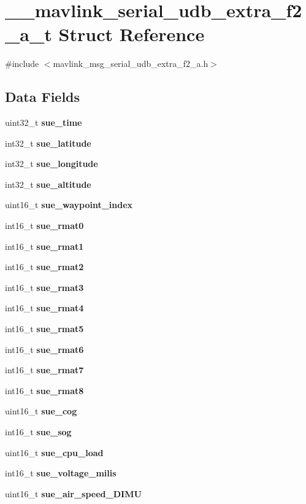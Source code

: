 \section{\+\_\+\+\_\+mavlink\+\_\+serial\+\_\+udb\+\_\+extra\+\_\+f2\+\_\+a\+\_\+t Struct Reference}
\label{struct____mavlink__serial__udb__extra__f2__a__t}


{\ttfamily \#include $<$mavlink\+\_\+msg\+\_\+serial\+\_\+udb\+\_\+extra\+\_\+f2\+\_\+a.\+h$>$}

\subsection*{Data Fields}
\begin{DoxyCompactItemize}
\item 
uint32\+\_\+t \textbf{ sue\+\_\+time}
\item 
int32\+\_\+t \textbf{ sue\+\_\+latitude}
\item 
int32\+\_\+t \textbf{ sue\+\_\+longitude}
\item 
int32\+\_\+t \textbf{ sue\+\_\+altitude}
\item 
uint16\+\_\+t \textbf{ sue\+\_\+waypoint\+\_\+index}
\item 
int16\+\_\+t \textbf{ sue\+\_\+rmat0}
\item 
int16\+\_\+t \textbf{ sue\+\_\+rmat1}
\item 
int16\+\_\+t \textbf{ sue\+\_\+rmat2}
\item 
int16\+\_\+t \textbf{ sue\+\_\+rmat3}
\item 
int16\+\_\+t \textbf{ sue\+\_\+rmat4}
\item 
int16\+\_\+t \textbf{ sue\+\_\+rmat5}
\item 
int16\+\_\+t \textbf{ sue\+\_\+rmat6}
\item 
int16\+\_\+t \textbf{ sue\+\_\+rmat7}
\item 
int16\+\_\+t \textbf{ sue\+\_\+rmat8}
\item 
uint16\+\_\+t \textbf{ sue\+\_\+cog}
\item 
int16\+\_\+t \textbf{ sue\+\_\+sog}
\item 
uint16\+\_\+t \textbf{ sue\+\_\+cpu\+\_\+load}
\item 
int16\+\_\+t \textbf{ sue\+\_\+voltage\+\_\+milis}
\item 
uint16\+\_\+t \textbf{ sue\+\_\+air\+\_\+speed\+\_\+D\+I\+MU}
\item 

\end{DoxyCompactItemize}
